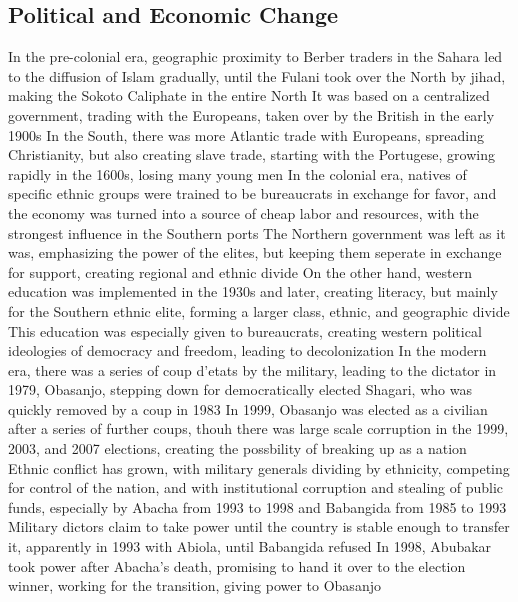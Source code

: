 \documentclass[11 pt, twoside]{article}
\newenvironment{outline*}
{
	\begin{outline}[enumerate]
	}
	{\end{outline}
}
\begin{document}
\subsection{Political and Economic Change}
\begin{outline*}
\1 In the pre-colonial era, geographic proximity to Berber traders in the Sahara led to the diffusion of Islam gradually, until the Fulani took over the North by jihad, making the Sokoto Caliphate in the entire North
\2 It was based on a centralized government, trading with the Europeans, taken over by the British in the early 1900s
\2 In the South, there was more Atlantic trade with Europeans, spreading Christianity, but also creating slave trade, starting with the Portugese, growing rapidly in the 1600s, losing many young men
\1 In the colonial era, natives of specific ethnic groups were trained to be bureaucrats in exchange for favor, and the economy was turned into a source of cheap labor and resources, with the strongest influence in the Southern ports
\2 The Northern government was left as it was, emphasizing the power of the elites, but keeping them seperate in exchange for support, creating regional and ethnic divide
\2 On the other hand, western education was implemented in the 1930s and later, creating literacy, but mainly for the Southern ethnic elite, forming a larger class, ethnic, and geographic divide
\3 This education was especially given to bureaucrats, creating western political ideologies of democracy and freedom, leading to decolonization
\1 In the modern era, there was a series of coup d'etats by the military, leading to the dictator in 1979, Obasanjo, stepping down for democratically elected Shagari, who was quickly removed by a coup in 1983
\2 In 1999, Obasanjo was elected as a civilian after a series of further coups, thouh there was large scale corruption in the 1999, 2003, and 2007 elections, creating the possbility of breaking up as a nation
\2 Ethnic conflict has grown, with military generals dividing by ethnicity, competing for control of the nation, and with institutional corruption and stealing of public funds, especially by Abacha from 1993 to 1998 and Babangida from 1985 to 1993
\2 Military dictors claim to take power until the country is stable enough to transfer it, apparently in 1993 with Abiola, until Babangida refused
\3 In 1998, Abubakar took power after Abacha's death, promising to hand it over to the election winner, working for the transition, giving power to Obasanjo
\end{outline*}
\end{document}
